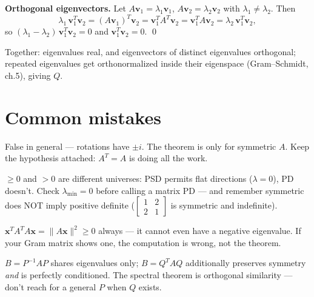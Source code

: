 \textbf{Orthogonal eigenvectors.} Let $A\mathbf v_1=\lambda_1\mathbf v_1$,
$A\mathbf v_2=\lambda_2\mathbf v_2$ with $\lambda_1\ne\lambda_2$. Then
\[
\lambda_1\,\mathbf v_1^{T}\mathbf v_2
=(A\mathbf v_1)^{T}\mathbf v_2
=\mathbf v_1^{T}A^{T}\mathbf v_2
=\mathbf v_1^{T}A\mathbf v_2
=\lambda_2\,\mathbf v_1^{T}\mathbf v_2,
\]
so $(\lambda_1-\lambda_2)\,\mathbf v_1^{T}\mathbf v_2=0$ and
$\mathbf v_1^{T}\mathbf v_2=0$. \qed

Together: eigenvalues real, and eigenvectors of distinct eigenvalues
orthogonal; repeated eigenvalues get orthonormalized inside their
eigenspace (Gram--Schmidt, ch.5), giving $Q$.

\section{Common mistakes}

\begin{tripwire}
False in general --- rotations have $\pm i$. The theorem is only for
symmetric $A$. Keep the hypothesis attached: $A^{T}=A$ is doing all the
work.
\end{tripwire}

\begin{tripwire}
$\ge0$ and $>0$ are different universes: PSD permits flat directions
($\lambda=0$), PD doesn't. Check $\lambda_{\min}=0$ before calling a
matrix PD --- and remember symmetric does NOT imply positive definite
($\begin{bmatrix}1&2\\2&1\end{bmatrix}$ is symmetric and indefinite).
\end{tripwire}

\begin{tripwire}
$\mathbf x^{T}A^{T}A\mathbf x=\lVert A\mathbf x\rVert^{2}\ge0$ always ---
it cannot even have a negative eigenvalue. If your Gram matrix shows one,
the computation is wrong, not the theorem.
\end{tripwire}

\begin{tripwire}
$B=P^{-1}AP$ shares eigenvalues only; $B=Q^{T}AQ$ additionally preserves
symmetry \emph{and} is perfectly conditioned. The spectral theorem is
orthogonal similarity --- don't reach for a general $P$ when $Q$ exists.
\end{tripwire}

